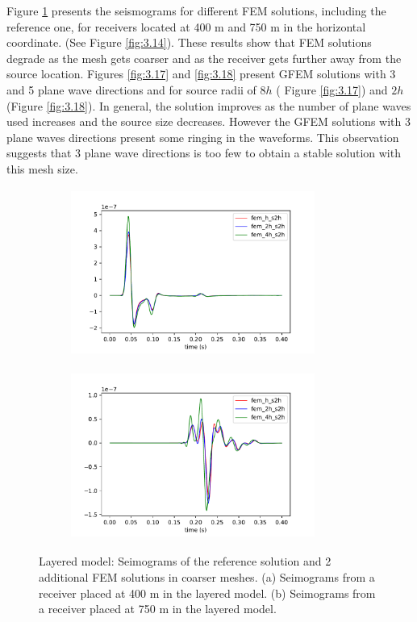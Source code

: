 \clearpage
Figure \ref{fig:3.16} presents the seismograms for different FEM solutions, including the reference one, for receivers located at 400 m and 750 m in the horizontal coordinate. (See Figure \ref{fig:3.14}). These results show that FEM solutions degrade as the mesh gets coarser and as the receiver gets further away from the source location.
Figures \ref{fig:3.17} and  \ref{fig:3.18} present GFEM solutions with 3 and 5 plane wave directions and for source radii of $8h$ ( Figure \ref{fig:3.17})  and $2h$ (Figure \ref{fig:3.18}). In general, the solution improves as the number of plane waves used increases and the source size decreases. However the GFEM solutions with 3 plane waves directions present some ringing in the waveforms. This observation suggests that 3 plane wave directions is too few to obtain a stable solution with this mesh size.

 \begin{figure}[h!]
 		\centering
		\begin{subfigure}{8cm}
				\includegraphics[width=8cm, height=5.5cm]{Thesis_Edith/figures/layered_model/layer_waves/fem_layered_tr1.pdf} 
			     \caption{}
		\end{subfigure}
        \hspace{0.25cm}	
		\begin{subfigure}{8cm}
				\includegraphics[width=8cm, height=5.5cm]{Thesis_Edith/figures/layered_model/layer_waves/fem_layered_tr50.pdf}
			   \caption{}
		\end{subfigure}
 
	\caption{Layered model: Seimograms of the reference solution and 2 additional FEM solutions in coarser meshes. (a) Seimograms from a receiver placed at 400 m in the layered model. (b) Seimograms from a receiver placed at 750 m in the layered model.}
	\label{fig:3.16}
\end{figure}

